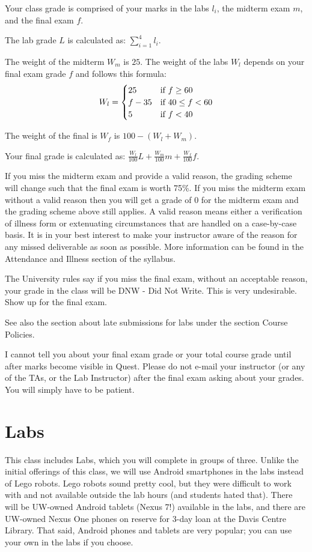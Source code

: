 \documentclass[letterpaper,10pt]{article}
\begin{document}
Your class grade is comprised of your marks in the labs $l_{i}$, the midterm exam $m$, and the final exam $f$.

The lab grade $L$ is calculated as: $\sum_{i=1}^{4}l_{i}$.

The weight of the midterm $W_{m}$ is $25$. The weight of the labs $W_{l}$ depends on your final exam grade $f$ and follows this formula:
\[
 W_{l} = \begin{cases}
        25      & $if~$ f \ge 60\\
        f - 35  & $if~$ 40 \le f < 60\\
        5       & $if~$ f < 40
        \end{cases}
\]

The weight of the final is $W_{f}$ is $100 - (W_{l} + W_{m})$.

Your final grade is calculated as: $\frac{W_{l}}{100}L + \frac{W_{m}}{100}m + \frac{W_{f}}{100}f $.

If you miss the midterm exam and provide a valid reason, the grading scheme will change such that the final exam is worth 75\%. If you miss the midterm exam without a valid reason then you will get a grade of 0 for the midterm exam and the grading scheme above still applies. A valid reason means either a verification of illness form or extenuating circumstances that are handled on a case-by-case basis. It is in your best interest to make your instructor aware of the reason for any missed deliverable as soon as possible. More information can be found in the Attendance and Illness section of the syllabus.

The University rules say if you miss the final exam, without an acceptable reason, your grade in the class will be DNW - Did Not Write. This is very undesirable. Show up for the final exam.

See also the section about late submissions for labs under the section Course Policies.

I cannot tell you about your final exam grade or your total course grade until after marks become visible in Quest. Please do not e-mail your instructor (or any of the TAs, or the Lab Instructor) after the final exam asking about your grades. You will simply have to be patient.


\section*{Labs}
This class includes Labs, which you will complete in groups of three. Unlike the initial offerings of this class, we will use Android smartphones in the labs instead of Lego robots. Lego robots sound pretty cool, but they were difficult to work with and not available outside the lab hours (and students hated that). There will be UW-owned Android tablets (Nexus 7!) available in the labs, and there are UW-owned Nexus One phones on reserve for 3-day loan at the Davis Centre Library. That said, Android phones and tablets are very popular; you can use your own in the labs if you choose.
\end{document}
